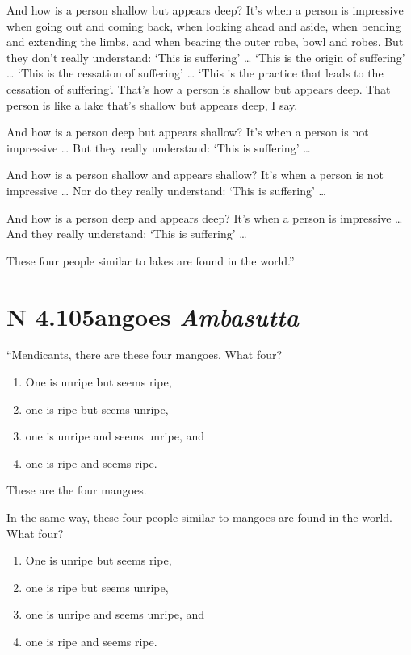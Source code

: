 \documentclass[12pt,openany]{book}%
\newcommand*{\suttatitleacronym}[1]{\smaller[2]{#1}\vspace*{.3em}}
\newcommand*{\suttatitletranslation}[1]{\linebreak{#1}}
\newcommand*{\suttatitleroot}[1]{\linebreak\smaller[2]\itshape{#1}}
\newcommand*{\tocacronym}[1]{\hspace*{-3.3em}{#1}\quad}
\newcommand*{\toctranslation}[1]{#1}
\newcommand*{\tocroot}[1]{(\textit{#1})}
\begin{document}
And how is a person shallow but appears deep? It’s when a person is impressive when going out and coming back, when looking ahead and aside, when bending and extending the limbs, and when bearing the outer robe, bowl and robes. But they don’t really understand: ‘This is suffering’ … ‘This is the origin of suffering’ … ‘This is the cessation of suffering’ … ‘This is the practice that leads to the cessation of suffering’. That’s how a person is shallow but appears deep. That person is like a lake that’s shallow but appears deep, I say. 

And how is a person deep but appears shallow? It’s when a person is not impressive … But they really understand: ‘This is suffering’ … 

And how is a person shallow and appears shallow? It’s when a person is not impressive … Nor do they really understand: ‘This is suffering’ … 

And how is a person deep and appears deep? It’s when a person is impressive … And they really understand: ‘This is suffering’ … 

These four people similar to lakes are found in the world.” 

%
\section*{{\suttatitleacronym AN 4.105}{\suttatitletranslation Mangoes }{\suttatitleroot Ambasutta}}
\addcontentsline{toc}{section}{\tocacronym{AN 4.105} \toctranslation{Mangoes } \tocroot{Ambasutta}}

“Mendicants, there are these four mangoes. What four? 

\begin{enumerate}%
\item One is unripe but seems ripe, %
\item one is ripe but seems unripe, %
\item one is unripe and seems unripe, and %
\item one is ripe and seems ripe. %
\end{enumerate}

These are the four mangoes. 

In the same way, these four people similar to mangoes are found in the world. What four? 

\begin{enumerate}%
\item One is unripe but seems ripe, %
\item one is ripe but seems unripe, %
\item one is unripe and seems unripe, and %
\item one is ripe and seems ripe. %
\end{enumerate}
\end{document}
